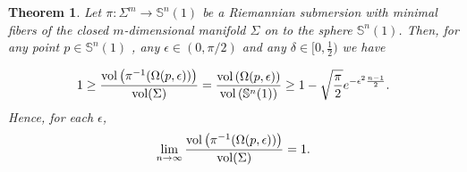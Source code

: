 \documentclass[11pt,letterpaper]{amsart}
\newtheorem{theorem}{Theorem}[section]
\theoremstyle{definition}
\theoremstyle{remark}
\begin{document}
\begin{theorem}\label{TeoSub1}
Let  $\pi: \Sigma^m \to \mathbb{S}^n(1)$ be a Riemannian submersion with minimal fibers  of the closed $m$-dimensional manifold $\Sigma$ on to the sphere  $\mathbb{S}^n(1)$. Then, for any point $p \in \mathbb{S}^n(1)$ , any  $\epsilon \in (0,\pi/2)$ and any $\delta\in [0,\frac{1}{2})$ we have 

\begin{equation}
1\geq \frac{{\rm vol}\left(\pi^{-1}(\Omega(p,\epsilon))\right)}{{\rm vol}(\Sigma)}=\frac{{\rm vol}\left(\Omega(p,\epsilon)\right)}{{\rm vol}\left(\mathbb{S}^n(1)\right)}\geq  1-\sqrt{\frac{\pi}{2}}e^{-\epsilon^2\frac{n-1}{2}}.
\end{equation}
Hence, for each  $\epsilon$,
\begin{equation}
\lim_{n\to\infty}\frac{{\rm vol}\left(\pi^{-1}(\Omega(p,\epsilon))\right)}{{\rm vol}(\Sigma)}=1.
\end{equation}
\end{theorem}
\end{document}
